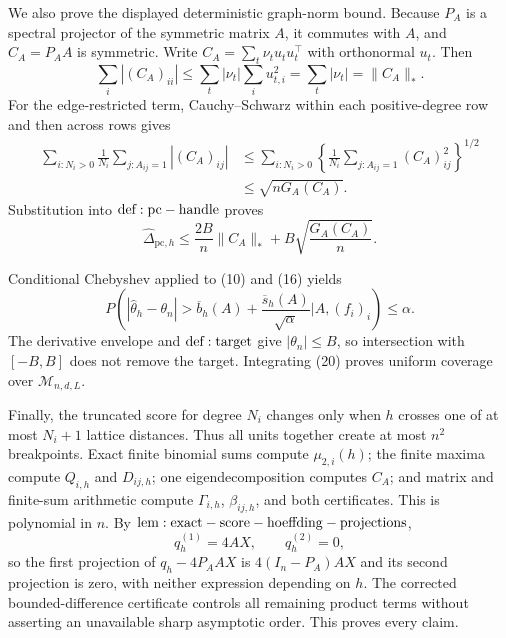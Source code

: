 We also prove the displayed deterministic graph-norm bound.  Because \(P_A\) is a spectral projector of the symmetric matrix \(A\), it commutes with \(A\), and \(C_A=P_AA\) is symmetric.  Write \(C_A=\sum_t\nu_tu_tu_t^\top\) with orthonormal \(u_t\).  Then
\[
 \sum_i|(C_A)_{ii}|
 \le\sum_t|\nu_t|\sum_i u_{t,i}^2
 =\sum_t|\nu_t|=\|C_A\|_*.
\tag{17}
\]
For the edge-restricted term, Cauchy--Schwarz within each positive-degree row and then across rows gives
\[
 \begin{aligned}
 \sum_{i:N_i>0}\frac1{N_i}\sum_{j:A_{ij}=1}|(C_A)_{ij}|
 &\le\sum_{i:N_i>0}
 \left\{\frac1{N_i}\sum_{j:A_{ij}=1}(C_A)_{ij}^2\right\}^{1/2}\\
 &\le\sqrt{nG_A(C_A)}.
 \end{aligned}
\tag{18}
\]
Substitution into \({\rm def:pc-handle}\) proves
\[
 \widehat\Delta_{\mathrm{pc},h}
 \le\frac{2B}{n}\|C_A\|_*+B\sqrt{\frac{G_A(C_A)}n}.
\tag{19}
\]

Conditional Chebyshev applied to (10) and (16) yields
\[
 P\!\left(
 |\widehat\theta_h-\theta_n|>
 \overline b_h(A)+\frac{\overline s_h(A)}{\sqrt\alpha}
 \mathrel{\Big|}A,(f_i)_i\right)\le\alpha.
\tag{20}
\]
The derivative envelope and \({\rm def:target}\) give \(|\theta_n|\le B\), so intersection with \([-B,B]\) does not remove the target.  Integrating (20) proves uniform coverage over \(\mathcal M_{n,d,L}\).

Finally, the truncated score for degree \(N_i\) changes only when \(h\) crosses one of at most \(N_i+1\) lattice distances.  Thus all units together create at most \(n^2\) breakpoints.  Exact finite binomial sums compute \(\mu_{2,i}(h)\); the finite maxima compute \(Q_{i,h}\) and \(D_{ij,h}\); one eigendecomposition computes \(C_A\); and matrix and finite-sum arithmetic compute \(\Gamma_{i,h}\), \(\beta_{ij,h}\), and both certificates.  This is polynomial in \(n\).  By \({\rm lem:exact-score-hoeffding-projections}\),
\[
 q_h^{(1)}=4AX,\qquad q_h^{(2)}=0,
\]
so the first projection of \(q_h-4P_AAX\) is \(4(I_n-P_A)AX\) and its second projection is zero, with neither expression depending on \(h\).  The corrected bounded-difference certificate controls all remaining product terms without asserting an unavailable sharp asymptotic order.  This proves every claim.